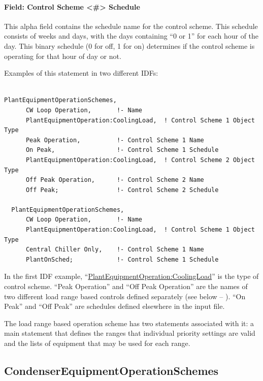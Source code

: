 \paragraph{Field: Control Scheme \textless{}\#\textgreater{} Schedule}\label{field-control-scheme-schedule}

This alpha field contains the schedule name for the control scheme. This schedule consists of weeks and days, with the days containing ``0 or 1'' for each hour of the day. This binary schedule (0 for off, 1 for on) determines if the control scheme is operating for that hour of day or not.

Examples of this statement in two different IDFs:

\begin{lstlisting}

PlantEquipmentOperationSchemes,
      CW Loop Operation,       !- Name
      PlantEquipmentOperation:CoolingLoad,  ! Control Scheme 1 Object Type
      Peak Operation,          !- Control Scheme 1 Name
      On Peak,                 !- Control Scheme 1 Schedule
      PlantEquipmentOperation:CoolingLoad,  ! Control Scheme 2 Object Type
      Off Peak Operation,      !- Control Scheme 2 Name
      Off Peak;                !- Control Scheme 2 Schedule

  PlantEquipmentOperationSchemes,
      CW Loop Operation,       !- Name
      PlantEquipmentOperation:CoolingLoad,  ! Control Scheme 1 Object Type
      Central Chiller Only,    !- Control Scheme 1 Name
      PlantOnSched;            !- Control Scheme 1 Schedule
\end{lstlisting}

In the first IDF example, ``\hyperref[plantequipmentoperationcoolingload]{PlantEquipmentOperation:CoolingLoad}'' is the type of control scheme. ``Peak Operation'' and ``Off Peak Operation'' are the names of two different load range based controls defined separately (see below -- ). ``On Peak'' and ``Off Peak'' are schedules defined elsewhere in the input file.

The load range based operation scheme has two statements associated with it: a main statement that defines the ranges that individual priority settings are valid and the lists of equipment that may be used for each range.

\subsection{CondenserEquipmentOperationSchemes}\label{condenserequipmentoperationschemes}

